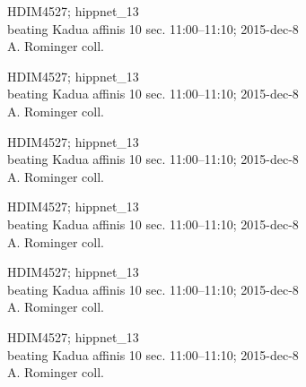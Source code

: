\documentclass[2pt]{extarticle}
\begin{document}
\noindent
\parbox{0.16\textwidth}{\tiny \raggedright \rule[-0.3\baselineskip]{0pt}{10pt}HDIM4527; hippnet\_13\\ beating Kadua affinis 10 sec. 11:00--11:10; 2015-dec-8\\ A. Rominger coll.}
\parbox{0.16\textwidth}{\tiny \raggedright \rule[-0.3\baselineskip]{0pt}{10pt}HDIM4527; hippnet\_13\\ beating Kadua affinis 10 sec. 11:00--11:10; 2015-dec-8\\ A. Rominger coll.}
\parbox{0.16\textwidth}{\tiny \raggedright \rule[-0.3\baselineskip]{0pt}{10pt}HDIM4527; hippnet\_13\\ beating Kadua affinis 10 sec. 11:00--11:10; 2015-dec-8\\ A. Rominger coll.}
\parbox{0.16\textwidth}{\tiny \raggedright \rule[-0.3\baselineskip]{0pt}{10pt}HDIM4527; hippnet\_13\\ beating Kadua affinis 10 sec. 11:00--11:10; 2015-dec-8\\ A. Rominger coll.}
\parbox{0.16\textwidth}{\tiny \raggedright \rule[-0.3\baselineskip]{0pt}{10pt}HDIM4527; hippnet\_13\\ beating Kadua affinis 10 sec. 11:00--11:10; 2015-dec-8\\ A. Rominger coll.}
\parbox{0.16\textwidth}{\tiny \raggedright \rule[-0.3\baselineskip]{0pt}{10pt}HDIM4527; hippnet\_13\\ beating Kadua affinis 10 sec. 11:00--11:10; 2015-dec-8\\ A. Rominger coll.} \\ 
\vspace{0.001in} 
\end{document}
